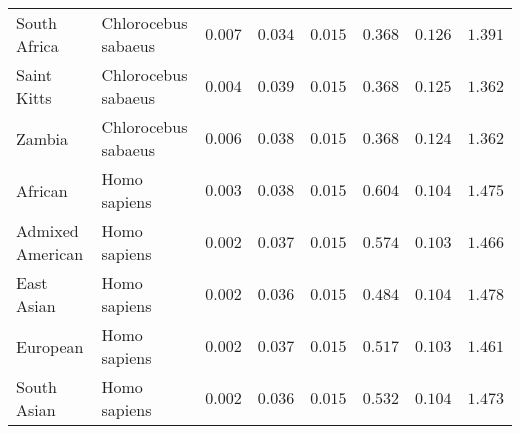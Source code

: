\documentclass{article}
\begin{document}
\begin{center}
\begin{longtable*}{|l|l|r|r|r|r|r|r|}
            South Africa         & Chlorocebus sabaeus & $ 0.007$        & $ 0.034$                   & $ 0.015$                      & $ 0.368$                             & $ 0.126$                      & $ 1.391$           \\
            Saint Kitts          & Chlorocebus sabaeus & $ 0.004$        & $ 0.039$                   & $ 0.015$                      & $ 0.368$                             & $ 0.125$                      & $ 1.362$           \\
            Zambia               & Chlorocebus sabaeus & $ 0.006$        & $ 0.038$                   & $ 0.015$                      & $ 0.368$                             & $ 0.124$                      & $ 1.362$           \\
            African              & Homo sapiens        & $ 0.003$        & $ 0.038$                   & $ 0.015$                      & $ 0.604$                             & $ 0.104$                      & $ 1.475$           \\
            Admixed American     & Homo sapiens        & $ 0.002$        & $ 0.037$                   & $ 0.015$                      & $ 0.574$                             & $ 0.103$                      & $ 1.466$           \\
            East Asian           & Homo sapiens        & $ 0.002$        & $ 0.036$                   & $ 0.015$                      & $ 0.484$                             & $ 0.104$                      & $ 1.478$           \\
            European             & Homo sapiens        & $ 0.002$        & $ 0.037$                   & $ 0.015$                      & $ 0.517$                             & $ 0.103$                      & $ 1.461$           \\
            South Asian          & Homo sapiens        & $ 0.002$        & $ 0.036$                   & $ 0.015$                      & $ 0.532$                             & $ 0.104$                      & $ 1.473$           \\
        \end{longtable*}
    \end{center}
\end{document}
